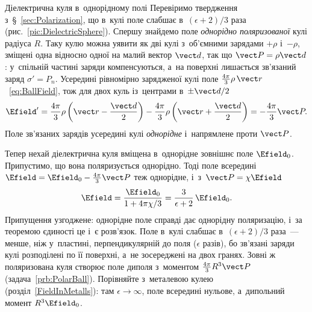 \begin{Example}{Діелектрична куля в~однорідному полі}
	Перевіримо твердження з~\S~\ref{sec:Polarization}, що в~кулі поле слабшає в~$(\epsilon+2)/3$
	раза (рис.~\ref{pic:DielectricSphere}). Спершу знайдемо поле \emph{однорідно поляризованої} кулі радіуса $R$. Таку кулю можна
	уявити як дві кулі з~об'ємними зарядами $+\rho$ і~$-\rho$, зміщені одна відносно одної на
	малий вектор $\vect d$, так що $\vect P = \rho\vect d$: у~спільній частині заряди
	компенсуються, а~на поверхні лишається зв'язаний заряд $\sigma' = P_n$. Усередині
	рівномірно зарядженої кулі поле $\frac{4\pi}{3}\rho\,\vect r$~\eqref{eq:BallField}, тож для
	двох куль із~центрами в~$\pm\vect d/2$
	\begin{equation*}
		\Efield' = \frac{4\pi}{3}\rho\left(\vect r - \frac{\vect d}{2}\right)
		- \frac{4\pi}{3}\rho\left(\vect r + \frac{\vect d}{2}\right)
		= -\frac{4\pi}{3}\vect P.
	\end{equation*}
	Поле зв'язаних зарядів усередині кулі \emph{однорідне} і~напрямлене проти $\vect P$.

	Тепер нехай діелектрична куля вміщена в~однорідне зовнішнє поле $\Efield_0$. Припустимо,
	що вона поляризується однорідно. Тоді поле всередині $\Efield = \Efield_0 -
	\frac{4\pi}{3}\vect P$ теж однорідне, і~з~$\vect P = \chi\Efield$
	\begin{equation*}
		\Efield = \frac{\Efield_0}{1 + 4\pi\chi/3} = \frac{3}{\epsilon+2}\,\Efield_0 .
	\end{equation*}
	Припущення узгоджене: однорідне поле справді дає однорідну поляризацію, і~за теоремою
	єдиності це і~є розв'язок. Поле в~кулі слабшає в~$(\epsilon+2)/3$ раза~--- менше, ніж
	у~пластині, перпендикулярній до поля ($\epsilon$ разів), бо зв'язані заряди кулі
	розподілені по її поверхні, а~не зосереджені на двох гранях. Зовні ж поляризована куля
	створює поле диполя з~моментом $\frac{4\pi}{3}R^3\vect P$ (задача~\ref{prb:PolarBall}).
	Порівняйте з~металевою кулею (розділ~\ref{FieldInMetalls}): там $\epsilon\to\infty$, поле
	всередині нульове, а~дипольний момент $R^3\Efield_0$.
\end{Example}

